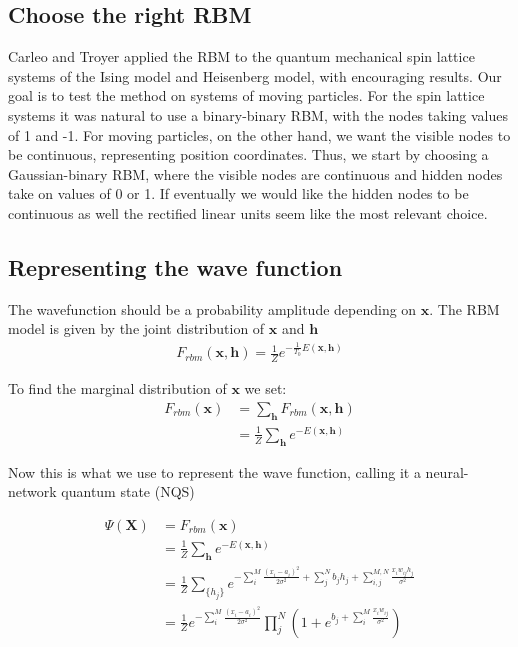 \documentclass[norsk,a4paper,11pt]{article}
\newcommand{\Vx}{\mathbf{x}}
\begin{document}
\subsection{Choose the right RBM}
Carleo and Troyer applied the RBM to the quantum mechanical spin lattice systems of the Ising model and Heisenberg model, with encouraging results. Our goal is to test the method on systems of moving particles. For the spin lattice systems it was natural to use a binary-binary RBM, with the nodes taking values of 1 and -1. For moving particles, on the other hand, we want the visible nodes to be continuous, representing position coordinates. Thus, we start by choosing a Gaussian-binary RBM, where the visible nodes are continuous and hidden nodes take on values of 0 or 1. If eventually we would like the hidden nodes to be continuous as well the rectified linear units seem like the most relevant choice.

\subsection{Representing the wave function}
The wavefunction should be a probability amplitude depending on $\bm{x}$. The RBM model is given by the joint distribution of $\bm{x}$ and $\bm{h}$
\begin{align}
	F_{rbm}(\Vx,\mathbf{h}) = \frac{1}{Z} e^{-\frac{1}{T_0}E(\Vx,\mathbf{h})}
\end{align}

To find the marginal distribution of $\bm{x}$ we set:
\begin{align}
	F_{rbm}(\mathbf{x}) &= \sum_\mathbf{h} F_{rbm}(\mathbf{x}, \mathbf{h}) \\
				&= \frac{1}{Z}\sum_\mathbf{h} e^{-E(\mathbf{x}, \mathbf{h})}
\end{align}

Now this is what we use to represent the wave function, calling it a neural-network quantum state (NQS)

\begin{align}
	\Psi (\mathbf{X}) &= F_{rbm}(\mathbf{x}) \\
	&= \frac{1}{Z}\sum_{\bm{h}} e^{-E(\mathbf{x}, \mathbf{h})} \\
	&= \frac{1}{Z} \sum_{\{h_j\}} e^{-\sum_i^M \frac{(x_i - a_i)^2}{2\sigma^2} + \sum_j^N b_j h_j + \sum_{i,j}^{M,N} \frac{x_i w_{ij} h_j}{\sigma^2}} \\
	&= \frac{1}{Z} e^{-\sum_i^M \frac{(x_i - a_i)^2}{2\sigma^2}} \prod_j^N (1 + e^{b_j + \sum_i^M \frac{x_i w_{ij}}{\sigma^2}}) \\
\end{align}
\end{document}
